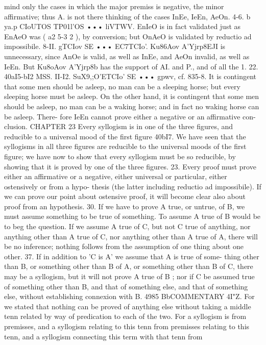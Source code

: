 {{{{{{{{{{mind only the cases in which the major premiss is negative, the
minor affirmative; thus A. is not there thinking of the cases
InEe, IeEn, AeOn.
4-6. b ya.p CIoUTOS TP01l'OS ••• liVTWV. EnIeO is in fact validated
just as EnAeO was ( a2 5-3 2 ), by conversion; but OnAeO is validated
by reductio ad impossibile.
8-II. gTCIov SE ••• EC7TCIo'. Ku86Aov A'Yjrp8EJI is unnecessary, since
AnOe is valid, as well as InEe, and AeOn invalid, as well as IeEn.
But Ku8oAov A'Yjrp8b has the support of AI. and P., and of all the
1.
22. 40aI5-bI2
MSS.
II-I2. SuX9,;O'ETCIo' SE ••• gpwv, cf. 835-8. It is contingent that
some men should be asleep, no man can be a sleeping horse; but
every sleeping horse must be asleep. On the other hand, it is
contingent that some men should be asleep, no man can be a
waking horse; and in fact no waking horse can be asleep. There-
fore IeEn cannot prove either a negative or an affirmative con-
clusion.
CHAPTER 23
Every syllogism is in one of the three figures, and reducible to a
universal mood of the first figure
40bI7. We have seen that the syllogisms in all three figures are
reducible to the universal moods of the first figure; we have now
to show that every syllogism must be so reducible, by showing
that it is proved by one of the three figures.
23. Every proof must prove either an affirmative or a negative,
either universal or particular, either ostensively or from a hypo-
thesis (the latter including reductio ad impossibile). If we can
prove our point about ostensive proof, it will become clear also
about proof from an hypothesis.
30. If we have to prove A true, or untrue, of B, we must
assume something to be true of something. To assume A true of
B would be to beg the question. If we assume A true of C, but
not C true of anything, nor anything other than A true of C, nor
anything other than A true of A, there will be no inference;
nothing follows from the assumption of one thing about one other.
37. If in addition to 'C is A' we assume that A is true of some-
thing other than B, or something other than B of A, or something
other than B of C, there may be a syllogism, but it will not prove
A true of B ; nor if C be assumed true of something other than B,
and that of something else, and that of something else, without
establishing connexion with B.
4985
BbCOMMENTARY
4I"Z. For we stated that nothing can be proved of anything
else without taking a middle tenn related by way of predication
to each of the two. For a syllogism is from premisses, and a
syllogism relating to this tenn from premisses relating to this
tenn, and a syllogism connecting this term with that tenn from
}}}}}}}}}}
